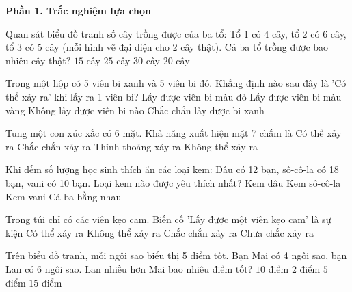 \textbf{Phần 1. Trắc nghiệm lựa chọn}

\begin{ex} %
Quan sát biểu đồ tranh số cây trồng được của ba tổ: Tổ 1 có 4 cây, tổ 2 có 6 cây, tổ 3 có 5 cây (mỗi hình vẽ đại diện cho 2 cây thật). Cả ba tổ trồng được bao nhiêu cây thật?
\choice
{$15$ cây}
{$25$ cây}
{\True $30$ cây}
{$20$ cây}
\end{ex}

\begin{ex} %
Trong một hộp có 5 viên bi xanh và 5 viên bi đỏ. Khẳng định nào sau đây là 'Có thể xảy ra' khi lấy ra 1 viên bi?
\choice
{\True Lấy được viên bi màu đỏ}
{Lấy được viên bi màu vàng}
{Không lấy được viên bi nào}
{Chắc chắn lấy được bi xanh}
\end{ex}

\begin{ex} %
Tung một con xúc xắc có 6 mặt. Khả năng xuất hiện mặt 7 chấm là
\choice
{Có thể xảy ra}
{Chắc chắn xảy ra}
{Thỉnh thoảng xảy ra}
{\True Không thể xảy ra}
\end{ex}

\begin{ex} %
Khi đếm số lượng học sinh thích ăn các loại kem: Dâu có 12 bạn, sô-cô-la có 18 bạn, vani có 10 bạn. Loại kem nào được yêu thích nhất?
\choice
{Kem dâu}
{\True Kem sô-cô-la}
{Kem vani}
{Cả ba bằng nhau}
\end{ex}

\begin{ex} %
Trong túi chỉ có các viên kẹo cam. Biến cố 'Lấy được một viên kẹo cam' là sự kiện
\choice
{Có thể xảy ra}
{Không thể xảy ra}
{\True Chắc chắn xảy ra}
{Chưa chắc xảy ra}
\end{ex}

\begin{ex} %
Trên biểu đồ tranh, mỗi ngôi sao biểu thị 5 điểm tốt. Bạn Mai có 4 ngôi sao, bạn Lan có 6 ngôi sao. Lan nhiều hơn Mai bao nhiêu điểm tốt?
\choice
{\True $10$ điểm}
{$2$ điểm}
{$5$ điểm}
{$15$ điểm}
\end{ex}

